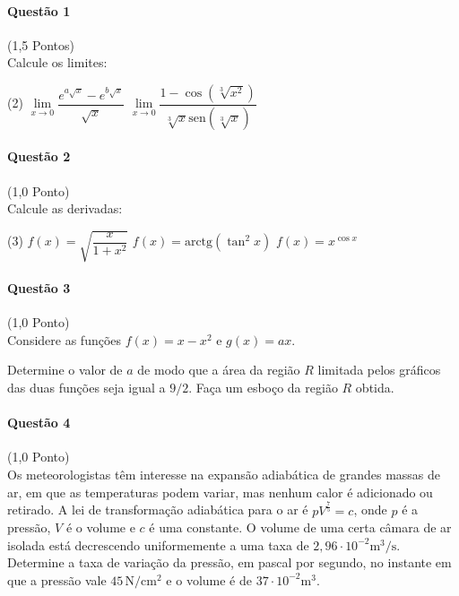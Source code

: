 \documentclass[12pt,a4paper]{article}
\begin{document}
\paragraph{Questão 1} (1,5 Pontos)\\
Calcule os limites:

\begin{tasks}(2)
\task $\lim\limits_{x\to 0} \dfrac{e^{a\sqrt{x}} - e^{b\sqrt{x}}}{\sqrt{x}}$
\task $\lim\limits_{x\to 0} \dfrac{1-\cos (\sqrt[3]{x^2})}{\sqrt[3]{x}\mathrm{sen}(\sqrt[3]{x})}$
\end{tasks}

\paragraph{Questão 2} (1,0 Ponto)\\
Calcule as derivadas:

\begin{tasks}(3)
\task $f(x) = \sqrt{\dfrac{x}{1+x^2}}$
\task $f(x) = \mathrm{arctg}(\tan^2 x)$
\task $f(x) = x^{\cos x}$
\end{tasks}

\paragraph{Questão 3} (1,0 Ponto)\\
Considere as funções $f(x) = x - x^2$ e $g(x) = ax$.

\begin{tasks}
\task Determine o valor de $a$ de modo que a área da região $R$ limitada pelos gráficos das duas funções seja igual a $9/2$.
\task Faça um esboço da região $R$ obtida.
\end{tasks}

\paragraph{Questão 4} (1,0 Ponto)\\
Os meteorologistas têm interesse na expansão adiabática de grandes massas de ar, em que as temperaturas podem variar, mas nenhum calor é adicionado ou retirado. A lei de transformação adiabática para o ar é $pV^{\frac{7}{5}} = c$, onde $p$ é a pressão, $V$ é o volume e $c$ é uma constante. O volume de uma certa câmara de ar isolada está decrescendo uniformemente a uma taxa de $2,96 \cdot 10^{-2} \mathrm{m^3/s}$. Determine a taxa de variação da pressão, em pascal por segundo, no instante em que a pressão vale $45\, \mathrm{N/cm^2}$ e o volume é de $37\cdot 10^{-2} \mathrm{ m^3}$.
\end{document}
